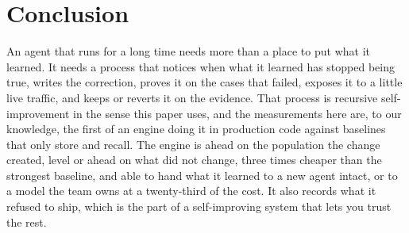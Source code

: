 \documentclass[11pt]{article}
\begin{document}
\section{Conclusion}

An agent that runs for a long time needs more than a place to put what it learned. It needs a
process that notices when what it learned has stopped being true, writes the correction, proves
it on the cases that failed, exposes it to a little live traffic, and keeps or reverts it on the
evidence. That process is recursive self-improvement in the sense this paper uses, and the
measurements here are, to our knowledge, the first of an engine doing it in production code
against baselines that
only store and recall. The engine is ahead on the population the change created, level or ahead
on what did not change, three times cheaper than the strongest baseline, and able to hand what it
learned to a new agent intact, or to a model the team owns at a twenty-third of the cost. It also records what it refused to ship, which
is the part of a self-improving system that lets you trust the rest.
\end{document}
